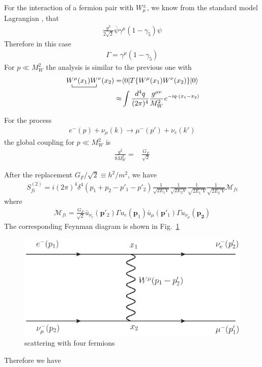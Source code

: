 For the interaction of a fermion pair with $W_\mu^\pm$, we know from
the standard model Lagrangian \cite{lsm}, that
\begin{align}
  \frac{g^2}{2\sqrt{2}}\overline{\psi}\gamma^\mu(1-\gamma_5)\psi
\end{align}
Therefore in this case
\begin{align}
  \Gamma=\gamma^\mu(1-\gamma_5)
\end{align}
For $p\ll M_W^2$ the analysis is similar to the previous one with
\begin{align}
   \bcontraction{\,}{W^\mu}{(x_1)}{W^\nu}
\,W^\mu(x_1)W^\nu(x_2)=&\langle0|T\{W^\mu(x_1)W^\nu(x_2)\}|0\rangle\nonumber\\
\approx&\int\frac{d^4q}{(2\pi)^4}\frac{g^{\mu\nu}}{M_W^2}e^{-i q\cdot(x_1-x_2)}
\end{align}

For the process 
\begin{align}
  e^-(p)+\nu_\mu(k)\to\mu^-(p')+\nu_e(k')
\end{align}
the global coupling for $p\ll M_W^2$ is
\begin{align}
  \frac{g^2}{8M_W^2}=&\frac{G_F}{\sqrt{2}}
\end{align}

After the replacement $G_F/\sqrt{2}\equiv h^2/m^2$, we have
\begin{align}
  \label{eq:101}
  S^{(2)}_{fi}=i(2\pi)^4\delta^{4}\left(p_1+p_2-p'_1-p'_2\right)
  \frac{1}{\sqrt{2E_1 V}}\frac{1}{\sqrt{2E_2 V}}
  \frac{1}{\sqrt{2E_1' V}}\frac{1}{\sqrt{2E_2' V}}
  \mathcal{M}_{fi}
\end{align}
where
\begin{align}
  \mathcal{M}_{fi}=\frac{G_F}{\sqrt{2}}
\bar{u}_{\nu_e}(\mathbf{p}'_2)\Gamma u_e(\mathbf{p}_1)\bar{u}_\mu(\mathbf{p}'_1)\Gamma u_{\nu_\mu}(\mathbf{p_2})
\end{align}
The corresponding Feynman diagram is shown in Fig.~\ref{fig:sw}
\begin{figure} %
  \centering %
  \includegraphics{scatteringw} %
  \caption{scattering with four fermions} %
  \label{fig:sw} %
\end{figure} %
Therefore we have


